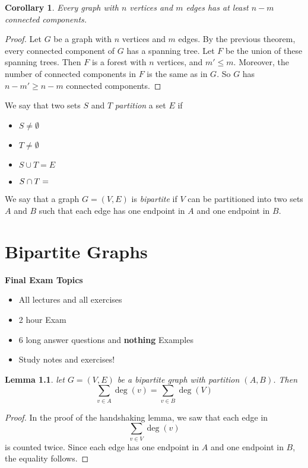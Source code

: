 \documentclass[openany]{report}
\newtheorem{corollary}{Corollary}[section]
\newtheorem{lemma}{Lemma}[section]
\begin{document}
\begin{corollary}
    Every graph with $n$ vertices and $m$ edges has at least $n-m$ connected components.
\end{corollary}
\begin{proof}
    Let $G$ be a graph with $n$ vertices and $m$ edges. By the previous theorem, every connected component of $G$ has a spanning tree. Let $F$ be the union of these spanning trees. Then $F$ is a forest with $n$ vertices, and $m' \leq m$. Moreover, the number of connected components in $F$ is the same as in $G$. So $G$ has $n - m' \geq n -m$ connected components.
\end{proof}
We say that two sets $S$ and $T$ \emph{partition} a set $E$ if 
\begin{itemize}
    \item $S \neq \emptyset$
    \item $T \neq \emptyset$
    \item $S \cup T = E$
    \item $S \cap T = \empty$ 
\end{itemize}
We say that a graph $G = (V, E)$ is \emph{bipartite} if $V$ can be partitioned into two sets $A$ and $B$ such that each edge has one endpoint in $A$ and one endpoint in $B$.

\chapter{Bipartite Graphs}
\textbf{ Final Exam Topics}
\begin{itemize}
    \item All lectures and all exercises
    \item 2 hour Exam
    \item 6 long answer questions and \textbf{nothing} Examples
    \item Study notes and exercises!
\end{itemize}
\begin{lemma}
    let $G = (V,E)$ be a bipartite graph with partition $(A,B)$. Then 
    \[\sum_{v \in A} \deg(v) = \sum_{v \in B} \deg(V)\]
\end{lemma}

\begin{proof}
    In the proof of the handshaking lemma, we saw that each edge in 
    \[\sum_{v \in V} \deg(v)\]
    is counted twice. Since each edge has one endpoint in $A$ and one endpoint in $B$, the equality follows. 
\end{proof}
\end{document}

